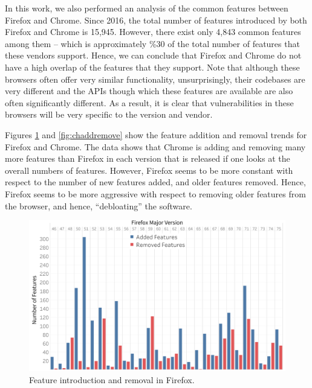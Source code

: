   In this work, we also performed an analysis of the common features
  between Firefox and Chrome. Since 2016, the total number of features
  introduced by both Firefox and Chrome is 15,945. However, there
  exist only 4,843 common features among them -- which is
  approximately \%30 of the total number of features that these
  vendors support. Hence, we can conclude that Firefox and Chrome do
  not have a high overlap of the features that they support. Note that
  although these browsers often offer very similar functionality,
  unsurprisingly, their codebases are very different and the APIs
  though which these features are available are also often
  significantly different. As a result, it is clear that
  vulnerabilities in these browsers will be very specific to the
  version and vendor.

  Figures \ref{fig:ffaddremove} and \ref{fig:chaddremove} show the
  feature addition and removal trends for Firefox and Chrome. The data
  shows that Chrome is adding and removing many more features than
  Firefox in each version that is released if one looks at the overall
  numbers of features. However, Firefox seems to be more constant with
  respect to the number of new features added, and older features
  removed. Hence, Firefox seems to be more aggressive with respect to
  removing older features from the browser, and hence, ``debloating''
  the software.

\begin{figure}[ht]
    \centering
    \includegraphics[width=\columnwidth]{figures/Firefox-add-remove.png}
    \caption{Feature introduction and removal in Firefox.}
    \label{fig:ffaddremove}
\end{figure}

